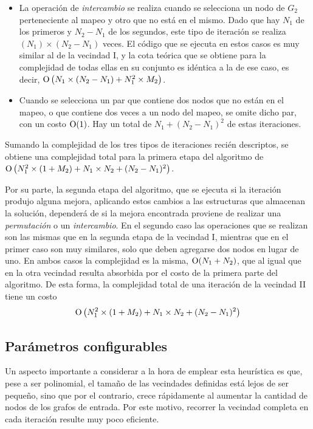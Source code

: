 \begin{itemize}
    \item La operación de \emph{intercambio} se realiza cuando se selecciona
    un nodo de $G_2$ perteneciente al mapeo y otro que no está en el mismo.
    Dado que hay $N_1$ de los primeros y $N_2 - N_1$ de los
    segundos, este tipo de iteración se realiza $(N_1) \times (N_2 - N_1)$
    veces. El código que se ejecuta en estos casos es muy similar al de la
    vecindad I, y la cota teórica que se obtiene para la complejidad de todas
    ellas en su conjunto es idéntica a la de ese caso, es decir,
    $\operatorname{O} \left( N_1 \times (N_2 - N_1) + N_1^2 \times M_2 \right)$.

    \item Cuando se selecciona un par que contiene dos nodos que no están en
    el mapeo, o que contiene dos veces a un nodo del mapeo, se omite dicho
    par, con un costo $\operatorname{O}(1)$. Hay un total de $N_1 + (N_2 - N_1)^2$ de
    estas iteraciones.
\end{itemize}

Sumando la complejidad de los tres tipos de iteraciones recién descriptos, se
obtiene una complejidad total para la primera etapa del algoritmo de
$\operatorname{O} \left( N_1^2 \times (1 + M_2) + N_1 \times N_2 + (N_2 - N_1)^2 \right)$.

Por su parte, la segunda etapa del algoritmo, que se ejecuta si la
iteración produjo alguna mejora, aplicando estos cambios a las estructuras
que almacenan la solución, dependerá de si la mejora encontrada proviene de
realizar una \emph{permutación} o un \emph{intercambio}. En el segundo
caso las operaciones que se realizan son las mismas que en la segunda etapa
de la vecindad I, mientras que en el primer caso son muy similares, solo que
deben agregarse dos nodos en lugar de uno. En ambos casos la complejidad es la
misma, $\operatorname{O} (N_1 + N_2)$, que al igual que en la otra vecindad resulta
absorbida por el costo de la primera parte del algoritmo. De esta forma, la
complejidad total de una iteración de la vecindad II tiene un costo
\[
\operatorname{O} \left( N_1^2 \times (1 + M_2) + N_1 \times N_2 + (N_2 - N_1)^2 \right)
\]

\subsection{Parámetros configurables}
Un aspecto importante a considerar a la hora de emplear esta heurística es
que, pese a ser polinomial, el tamaño de las vecindades definidas está lejos
de ser pequeño, sino que por el contrario, crece rápidamente al aumentar la
cantidad de nodos de los grafos de entrada. Por este motivo, recorrer la
vecindad completa en cada iteración resulte muy poco eficiente.

